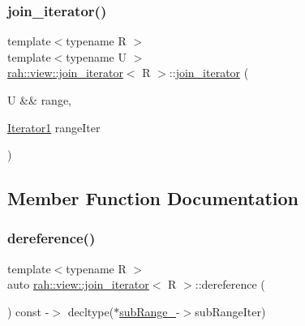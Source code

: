 \subsubsection{\texorpdfstring{join\_iterator()}{join\_iterator()}\hspace{0.1cm}{\footnotesize\ttfamily [4/4]}}
{\footnotesize\ttfamily template$<$typename R $>$ \\
template$<$typename U $>$ \\
\mbox{\hyperlink{structrah_1_1view_1_1join__iterator}{rah\+::view\+::join\+\_\+iterator}}$<$ R $>$\+::\mbox{\hyperlink{structrah_1_1view_1_1join__iterator}{join\+\_\+iterator}} (\begin{DoxyParamCaption}\item[{U \&\&}]{range,  }\item[{\mbox{\hyperlink{structrah_1_1view_1_1join__iterator_a8b71c6f25eee2915e2a8afc6e024196d}{Iterator1}}}]{range\+Iter }\end{DoxyParamCaption})\hspace{0.3cm}{\ttfamily [inline]}}



\subsection{Member Function Documentation}
\mbox{\label{structrah_1_1view_1_1join__iterator_ac7bc0fcd91d164f86d5813421a08d38a}} 
\subsubsection{\texorpdfstring{dereference()}{dereference()}\hspace{0.1cm}{\footnotesize\ttfamily [1/2]}}
{\footnotesize\ttfamily template$<$typename R $>$ \\
auto \mbox{\hyperlink{structrah_1_1view_1_1join__iterator}{rah\+::view\+::join\+\_\+iterator}}$<$ R $>$\+::dereference (\begin{DoxyParamCaption}{ }\end{DoxyParamCaption}) const -\/$>$ decltype($\ast$\mbox{\hyperlink{structrah_1_1view_1_1join__iterator_ae9351284af0f64c368606315da0b56a5}{sub\+Range\+\_\+}}-\/$>$sub\+Range\+Iter) \hspace{0.3cm}{\ttfamily [inline]}}

